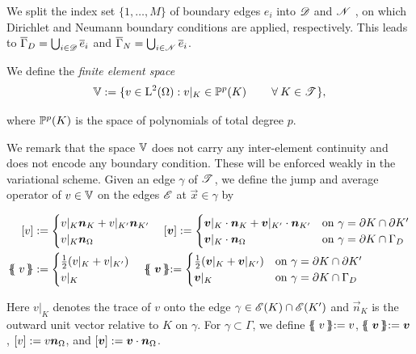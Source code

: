 \documentclass[a4paper,11pt]{article}
\begin{document}
We split the index set $\{1,\dots,M\}$ of boundary edges $e_{i}$ into $\mathscr D$ and $\mathscr N$ , on which Dirichlet and Neumann boundary conditions are applied, respectively. This leads to $\overline{\Gamma}_{D} = \bigcup_{i\in \mathscr D}\overline{e}_{i}$ and $\overline{\Gamma}_{N} = \bigcup_{i\in \mathscr N}\overline{e}_{i}$. 

We define the \emph{finite element space}
\begin{gather}
  \label{eqn:def:finite-element-space}
  \mathbb V :=   \{ v\in \operatorname L^{2}(\Omega): v|_K \in \mathbb P^{p} (K) \quad \quad\:\forall\: K \in \mathscr T^{} \},
\end{gather}

where $\mathbb P^{p} (K)$ is the space of polynomials of total degree $p$.

We remark that the space $\mathbb V$ does not carry any inter-element continuity and does not encode any boundary condition. These will be enforced weakly in the variational scheme. 
Given an edge $\gamma$ of $\mathscr T^{}$, we define the jump and average operator of $v \in \mathbb V$ on the edges $\mathscr E$ at $\vec{x} \in \gamma$  by

\begin{align}
    \jump{v} &:=
    \begin{cases}
        v |_{K} \vec{n}_{K} + v |_{K'} \vec{n}_{K'} \\
        v |_{K} \vec{n}_{\Omega} 
    \end{cases} 
    \jump{\vec{v}} :=
    \begin{cases}
        \vec{v} |_{K} \cdot \vec{n}_{K} + \vec{v} |_{K'} \cdot \vec{n}_{K'} &  \text{on } \gamma = \partial K \cap  \partial K'\\
        \vec{v} |_{K} \cdot \vec{n}_{\Omega} &  \text{on } \gamma = \partial K \cap  \Gamma_{D} 
    \end{cases}
    \\
    \avg{v} &:=
    \begin{cases}
        \frac{1}{2} ( v |_{K} + v |_{K'}) \\
        v |_{K}  
    \end{cases} 
    \avg{\vec{v}} :=
    \begin{cases}
        \frac{1}{2}(\vec{v} |_{K} + \vec{v} |_{K'}) &  \text{on } \gamma = \partial K \cap  \partial K'\\
        \vec{v} |_{K} &  \text{on } \gamma = \partial K \cap  \Gamma_{D} 
    \end{cases}
\end{align}

Here $v|_{K}$ denotes the trace of $v$ onto the edge $\gamma \in \mathscr E(K) \cap \mathscr E(K')$ and $\vec{n}_{K}$ is the outward unit vector relative to $K$ on $\gamma$. For $\gamma \subset \Gamma$, we define $\avg{v} := v$, $\avg{\vec{v}} := \vec{v}$, $\left[ v\right]:= v\boldsymbol n_{\Omega}  $, and $\left[ \boldsymbol v\right]:= \boldsymbol v \cdot \boldsymbol n_{\Omega}$.
\end{document}
